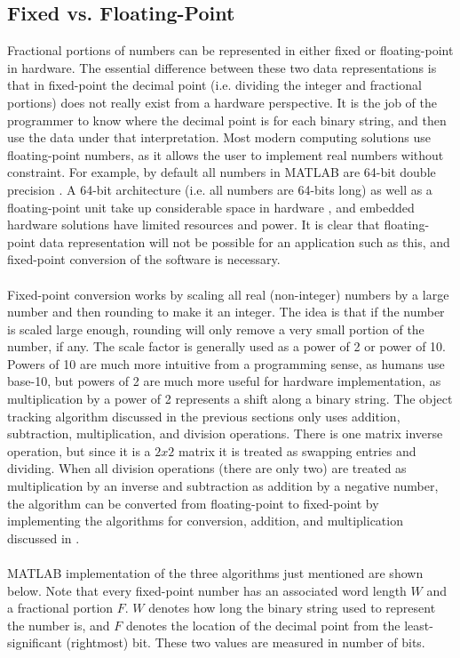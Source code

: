 \documentclass[12pt]{article} %
\begin{document}
\subsection{Fixed vs. Floating-Point}
\label{sec:fp}
Fractional portions of numbers can be represented in either fixed or floating-point in hardware. The essential difference between these two data representations is that in fixed-point the decimal point (i.e. dividing the integer and fractional portions) does not really exist from a hardware perspective. It is the job of the programmer to know where the decimal point is for each binary string, and then use the data under that interpretation. Most modern computing solutions use floating-point numbers, as it allows the user to implement real numbers without constraint. For example, by default all numbers in MATLAB are 64-bit double precision \cite{10}. A 64-bit architecture (i.e. all numbers are 64-bits long) as well as a floating-point unit take up considerable space in hardware \cite{10}, and embedded hardware solutions have limited resources and power. It is clear that floating-point data representation will not be possible for an application such as this, and fixed-point conversion of the software is necessary. \\\\
Fixed-point conversion works by scaling all real (non-integer) numbers by a large number and then rounding to make it an integer. The idea is that if the number is scaled large enough, rounding will only remove a very small portion of the number, if any. The scale factor is generally used as a power of 2 or power of 10. Powers of 10 are much more intuitive from a programming sense, as humans use base-10, but powers of 2 are much more useful for hardware implementation, as multiplication by a power of 2 represents a shift along a binary string. The object tracking algorithm discussed in the previous sections only uses addition, subtraction, multiplication, and division operations. There is one matrix inverse operation, but since it is a $2x2$ matrix it is treated as swapping entries and dividing. When all division operations (there are only two) are treated as multiplication by an inverse and subtraction as addition by a negative number, the algorithm can be converted from floating-point to fixed-point by implementing the algorithms for conversion, addition, and multiplication discussed in \cite{10}. \\\\
MATLAB implementation of the three algorithms just mentioned are shown below. Note that every fixed-point number has an associated word length $W$ and a fractional portion $F$. $W$ denotes how long the binary string used to represent the number is, and $F$ denotes the location of the decimal point from the least-significant (rightmost) bit. These two values are measured in number of bits.\\\\
\end{document}
